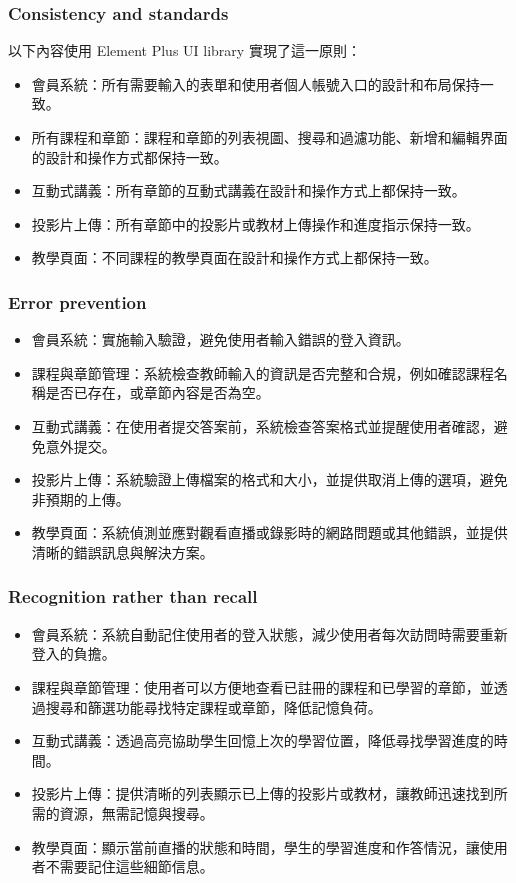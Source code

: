 \documentclass[12pt]{article}
\begin{document}
\subsubsection{Consistency and standards}

以下內容使用 Element Plus UI library 實現了這一原則：

\begin{itemize}
  \item 會員系統：所有需要輸入的表單和使用者個人帳號入口的設計和布局保持一致。
  \item 所有課程和章節：課程和章節的列表視圖、搜尋和過濾功能、新增和編輯界面的設計和操作方式都保持一致。
  \item 互動式講義：所有章節的互動式講義在設計和操作方式上都保持一致。
  \item 投影片上傳：所有章節中的投影片或教材上傳操作和進度指示保持一致。
  \item 教學頁面：不同課程的教學頁面在設計和操作方式上都保持一致。
\end{itemize}

\subsubsection{Error prevention}

\begin{itemize}
  \item 會員系統：實施輸入驗證，避免使用者輸入錯誤的登入資訊。
  \item 課程與章節管理：系統檢查教師輸入的資訊是否完整和合規，例如確認課程名稱是否已存在，或章節內容是否為空。
  \item 互動式講義：在使用者提交答案前，系統檢查答案格式並提醒使用者確認，避免意外提交。
  \item 投影片上傳：系統驗證上傳檔案的格式和大小，並提供取消上傳的選項，避免非預期的上傳。
  \item 教學頁面：系統偵測並應對觀看直播或錄影時的網路問題或其他錯誤，並提供清晰的錯誤訊息與解決方案。
\end{itemize}

\subsubsection{Recognition rather than recall}

\begin{itemize}
  \item 會員系統：系統自動記住使用者的登入狀態，減少使用者每次訪問時需要重新登入的負擔。
  \item 課程與章節管理：使用者可以方便地查看已註冊的課程和已學習的章節，並透過搜尋和篩選功能尋找特定課程或章節，降低記憶負荷。
  \item 互動式講義：透過高亮協助學生回憶上次的學習位置，降低尋找學習進度的時間。
  \item 投影片上傳：提供清晰的列表顯示已上傳的投影片或教材，讓教師迅速找到所需的資源，無需記憶與搜尋。
  \item 教學頁面：顯示當前直播的狀態和時間，學生的學習進度和作答情況，讓使用者不需要記住這些細節信息。
\end{itemize}
\end{document}
